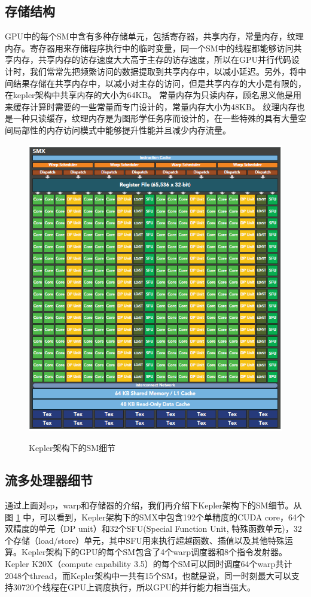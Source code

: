 \subsection{存储结构}
GPU中的每个SM中含有多种存储单元，包括寄存器，共享内存，常量内存，纹理内存。寄存器用来存储程序执行中的临时变量，同一个SM中的线程都能够访问共享内存，共享内存的访存速度大大高于主存的访存速度，所以在GPU并行代码设计时，我们常常先把频繁访问的数据提取到共享内存中，以减小延迟。另外，将中间结果存储在共享内存中，以减小对主存的访问，但是共享内存的大小是有限的，在kepler架构中共享内存的大小为64KB。
常量内存为只读内存，顾名思义他是用来缓存计算时需要的一些常量而专门设计的，常量内存大小为48KB。 纹理内存也是一种只读缓存，纹理内存是为图形学任务序而设计的，在一些特殊的具有大量空间局部性的内存访问模式中能够提升性能并且减少内存流量。
\begin{figure}
\setlength{\belowcaptionskip}{-0.5cm}
\begin{center}
{\includegraphics[width=1 \textwidth]{figures/smx.png}}
\end{center}
\caption{{\footnotesize{Kepler架构下的SM细节}}}
\label{sm}
\end{figure}
\subsection{流多处理器细节}
通过上面对sp，warp和存储器的介绍，我们再介绍下Kepler架构下的SM细节。从图 \ref{sm} 中，可以看到，Kepler架构下的SMX中包含192个单精度的CUDA core，64个双精度的单元（DP unit）和32个SFU(Special Function Unit, 特殊函数单元)，32个存储（load/store）单元，其中SFU用来执行超越函数、插值以及其他特殊运算。Kepler架构下的GPU的每个SM包含了4个warp调度器和8个指令发射器。 Kepler K20X（compute capability 3.5）的每个SM可以同时调度64个warp共计2048个thread，而Kepler架构中一共有15个SM，也就是说，同一时刻最大可以支持30720个线程在GPU上调度执行，所以GPU的并行能力相当强大。

